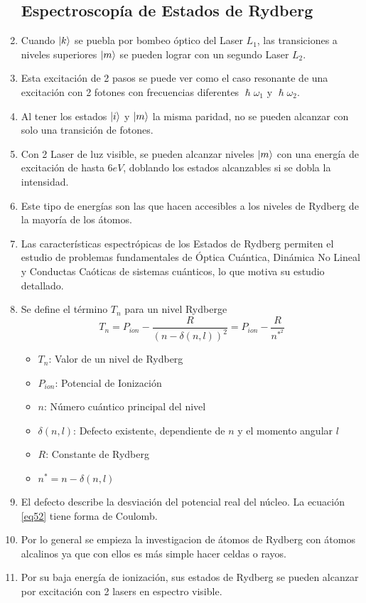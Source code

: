 \documentclass[aps,rmp,reprint,longbibliography]{revtex4-1}
\begin{document}
\begin{enumerate}
\subsection{Espectroscopía de Estados de Rydberg}
\item Cuando $\ket{k}$ se puebla por bombeo óptico del Laser $L_1$, las transiciones a niveles superiores $\ket{m}$ se pueden lograr con un segundo Laser $L_2$. 
\item Esta excitación de 2 pasos se puede ver como el caso resonante de una excitación con 2 fotones con frecuencias diferentes $\hslash\omega_1$ y $\hslash\omega_2$. 
\item Al tener los estados $\ket{i}$ y $\ket{m}$ la misma paridad, no se pueden alcanzar con solo una transición de fotones. 
\item Con 2 Laser de luz visible, se pueden alcanzar niveles $\ket{m}$ con una energía de excitación de hasta $6 eV$, doblando los estados alcanzables si se dobla la intensidad.
\item Este tipo de energías son las que hacen accesibles a los niveles de Rydberg de la mayoría de los átomos.
\item Las características espectrópicas de los Estados de Rydberg permiten el estudio de problemas fundamentales de Óptica Cuántica, Dinámica No Lineal y Conductas Caóticas de sistemas cuánticos, lo que motiva su estudio detallado.
\item Se define el término $T_n$ para un nivel Rydberge
\begin{equation}\label{eq52}T_n=P_{ion}-\frac{R}{(n-\delta(n,l))^2}=P_{ion}-\frac{R}{n^{*^2}}\end{equation}
\begin{itemize}
    \item $T_n$: Valor de un nivel de Rydberg
    \item $P_{ion}$: Potencial de Ionización
    \item $n$: Número cuántico principal del nivel
    \item $\delta(n,l)$: Defecto existente, dependiente de $n$ y el momento angular $l$
    \item $R$: Constante de Rydberg
    \item $n^*=n-\delta(n,l)$
\end{itemize}
\item El defecto describe la desviación del potencial real del núcleo. La ecuación \ref{eq52} tiene forma de Coulomb.
\item Por lo general se empieza la investigacion de  átomos de Rydberg con átomos alcalinos ya que con ellos es más simple hacer celdas o rayos. 
\item Por su baja energía de ionización, sus estados de Rydberg se pueden alcanzar por excitación con 2 lasers en espectro visible. 
\end{enumerate}
\end{document}
